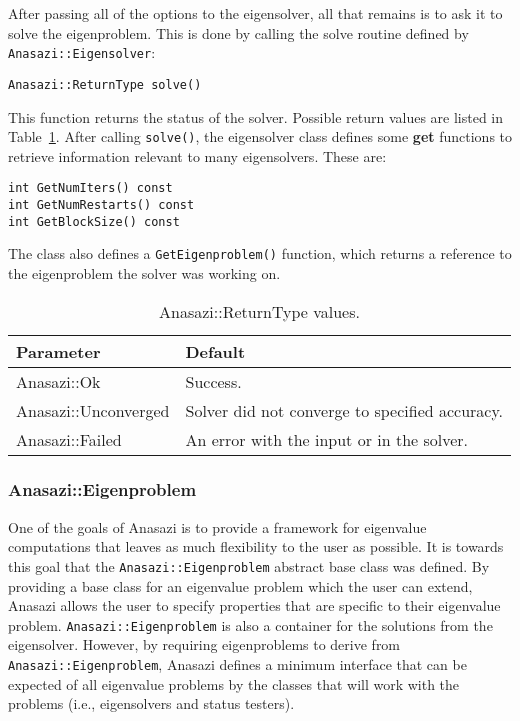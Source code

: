 After passing all of the options to the eigensolver, all that remains is to ask
it to solve the eigenproblem. This is done by calling the solve routine 
defined by \verb!Anasazi::Eigensolver!:
\begin{verbatim}
Anasazi::ReturnType solve()
\end{verbatim}
This function returns the status of the solver. Possible return values are
listed in Table~\ref{tab:anasazi:rt}. After calling \verb!solve()!, the
eigensolver class defines some \textbf{get} functions to retrieve information
relevant to many eigensolvers. These are:
\begin{verbatim}
int GetNumIters() const
int GetNumRestarts() const
int GetBlockSize() const 
\end{verbatim}
The class also defines a \verb!GetEigenproblem()! function, which returns a
reference to the eigenproblem the solver was working on.

\begin{table}
\begin{center}
\begin{tabular}{| p{4cm} l |}
\hline
Parameter & Default \\
\hline
Anasazi::Ok          & Success. \\
Anasazi::Unconverged & Solver did not converge to specified accuracy. \\
Anasazi::Failed      & An error with the input or in the solver. \\
\hline
\end{tabular}
\caption{Anasazi::ReturnType values.}
\label{tab:anasazi:rt}
\end{center}
\end{table}

\subsubsection{Anasazi::Eigenproblem}
\label{sec:anasazi:eigenproblem}

One of the goals of Anasazi is to provide a framework for eigenvalue
computations that leaves as much flexibility to the user as possible. It is
towards this goal that the \verb!Anasazi::Eigenproblem! abstract base class was
defined. By providing a base class for an eigenvalue problem which the user can
extend, Anasazi allows the user to specify properties that are specific to
their eigenvalue problem. \verb!Anasazi::Eigenproblem! is also a container for
the solutions from the eigensolver. However, by requiring eigenproblems to
derive from \verb!Anasazi::Eigenproblem!, Anasazi defines a minimum interface
that can be expected of all eigenvalue problems by the classes that will work
with the problems (i.e., eigensolvers and status testers).

